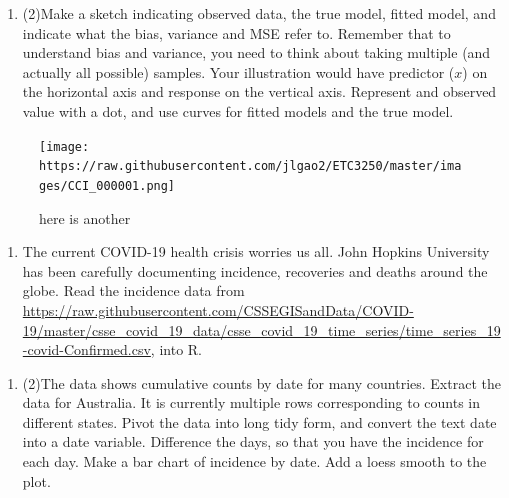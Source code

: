 \documentclass[
]{article}
\providecommand{\tightlist}{%
  \setlength{\itemsep}{0pt}\setlength{\parskip}{0pt}}
\begin{document}
\begin{enumerate}
\def\labelenumi{\alph{enumi}.}
\setcounter{enumi}{3}
\tightlist
\item
  (2)Make a sketch indicating observed data, the true model, fitted
  model, and indicate what the bias, variance and MSE refer to. Remember
  that to understand bias and variance, you need to think about taking
  multiple (and actually all possible) samples. Your illustration would
  have predictor (\(x\)) on the horizontal axis and response on the
  vertical axis. Represent and observed value with a dot, and use curves
  for fitted models and the true model.
\end{enumerate}

\begin{figure}
\centering
\texttt{[image: https://raw.githubusercontent.com/jlgao2/ETC3250/master/images/CCI\_000001.png]}
\caption{here is another}
\end{figure}

\begin{enumerate}
\def\labelenumi{\arabic{enumi}.}
\setcounter{enumi}{1}
\tightlist
\item
  The current COVID-19 health crisis worries us all. John Hopkins
  University has been carefully documenting incidence, recoveries and
  deaths around the globe. Read the incidence data from
  \url{https://raw.githubusercontent.com/CSSEGISandData/COVID-19/master/csse_covid_19_data/csse_covid_19_time_series/time_series_19-covid-Confirmed.csv},
  into R.
\end{enumerate}

\begin{enumerate}
\def\labelenumi{\alph{enumi}.}
\tightlist
\item
  (2)The data shows cumulative counts by date for many countries.
  Extract the data for Australia. It is currently multiple rows
  corresponding to counts in different states. Pivot the data into long
  tidy form, and convert the text date into a date variable. Difference
  the days, so that you have the incidence for each day. Make a bar
  chart of incidence by date. Add a loess smooth to the plot.
\end{enumerate}
\end{document}
